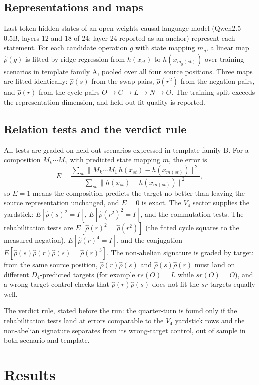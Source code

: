 \documentclass[11pt]{article}
\begin{document}
\subsection{Representations and maps}
Last-token hidden states of an open-weights causal language model
(Qwen2.5-0.5B, layers 12 and 18 of 24; layer 24 reported as an anchor) represent each
statement. For each candidate operation $g$ with state mapping $m_g$, a linear map
$\hat\rho(g)$ is fitted by ridge regression from $h(x_{st})$ to $h(x_{m_g(st)})$ over
training scenarios in template family A, pooled over all four source positions. Three maps
are fitted identically: $\hat\rho(s)$ from the swap pairs, $\hat\rho(r^2)$ from the negation
pairs, and $\hat\rho(r)$ from the cycle pairs $O \to C \to L \to N \to O$. The training
split exceeds the representation dimension, and held-out fit quality is reported.

\subsection{Relation tests and the verdict rule}
All tests are graded on held-out scenarios expressed in template family B. For a
composition $M_k \cdots M_1$ with predicted state mapping $m$, the error is
\[
E = \frac{\sum_{st} \lVert M_k \cdots M_1\, h(x_{st}) - h(x_{m(st)}) \rVert^2}
         {\sum_{st} \lVert h(x_{st}) - h(x_{m(st)}) \rVert^2},
\]
so $E = 1$ means the composition predicts the target no better than leaving the source
representation unchanged, and $E = 0$ is exact. The $V_4$ sector supplies the yardstick:
$E[\hat\rho(s)^2 = I]$, $E[\hat\rho(r^2)^2 = I]$, and the commutation tests. The
rehabilitation tests are $E[\hat\rho(r)^2 = \hat\rho(r^2)]$ (the fitted cycle squares to the
measured negation), $E[\hat\rho(r)^4 = I]$, and the conjugation
$E[\hat\rho(s)\hat\rho(r)\hat\rho(s) = \hat\rho(r)^3]$. The non-abelian signature is graded
by target: from the same source position, $\hat\rho(r)\hat\rho(s)$ and
$\hat\rho(s)\hat\rho(r)$ must land on different $D_4$-predicted targets (for example
$rs(O) = L$ while $sr(O) = O$), and a wrong-target control checks that
$\hat\rho(r)\hat\rho(s)$ does not fit the $sr$ targets equally well.

The verdict rule, stated before the run: the quarter-turn is found only if the
rehabilitation tests land at errors comparable to the $V_4$ yardstick rows and the
non-abelian signature separates from its wrong-target control, out of sample in both
scenario and template.

\section{Results}
\label{sec:results}
\end{document}
